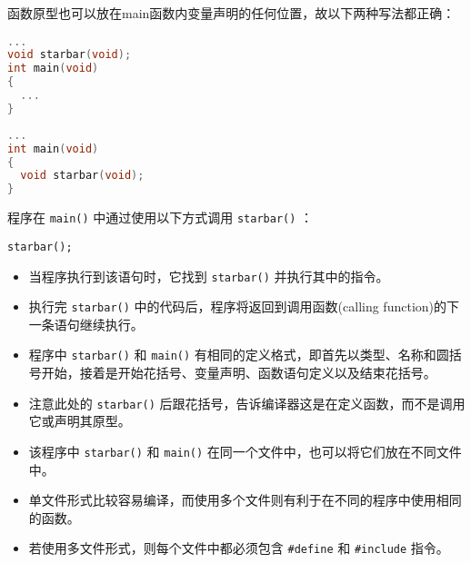 \begin{frame}[fragile]
函数原型也可以放在main函数内变量声明的任何位置，故以下两种写法都正确：
\begin{lstlisting}[language=c,backgroundcolor=\color{red!10}]
...
void starbar(void);
int main(void)
{
  ...
}
\end{lstlisting}

\begin{lstlisting}[language=c,backgroundcolor=\color{red!10}]
...
int main(void)
{
  void starbar(void);
}
\end{lstlisting}

\end{frame}

\begin{frame}[fragile]
程序在 \lstinline|main()| 中通过使用以下方式调用 \lstinline|starbar()| ：
\begin{lstlisting}
starbar();
\end{lstlisting}
\begin{itemize}
\item
当程序执行到该语句时，它找到 \lstinline|starbar()| 并执行其中的指令。\\[0.1in]
\item 
执行完 \lstinline|starbar()| 中的代码后，程序将返回到调用函数{\tf (calling function)}的下一条语句继续执行。 
\end{itemize}
\end{frame}

\begin{frame}[fragile]
\begin{itemize}
\item
程序中 \lstinline|starbar()| 和 \lstinline|main()| 有相同的定义格式，即首先以类型、名称和圆括号开始，接着是开始花括号、变量声明、函数语句定义以及结束花括号。\\[0.1in]
\item 
注意此处的 \lstinline|starbar()| 后跟花括号，告诉编译器这是在定义函数，而不是调用它或声明其原型。
\end{itemize}

\end{frame}

\begin{frame}[fragile]
\begin{itemize}
\item
该程序中 \lstinline|starbar()| 和 \lstinline|main()| 在同一个文件中，也可以将它们放在不同文件中。\\[0.1in]
\item 
单文件形式比较容易编译，而使用多个文件则有利于在不同的程序中使用相同的函数。\\[0.1in]
\item 
若使用多文件形式，则每个文件中都必须包含 \lstinline|#define| 和 \lstinline|#include| 指令。
\end{itemize}

\end{frame}

